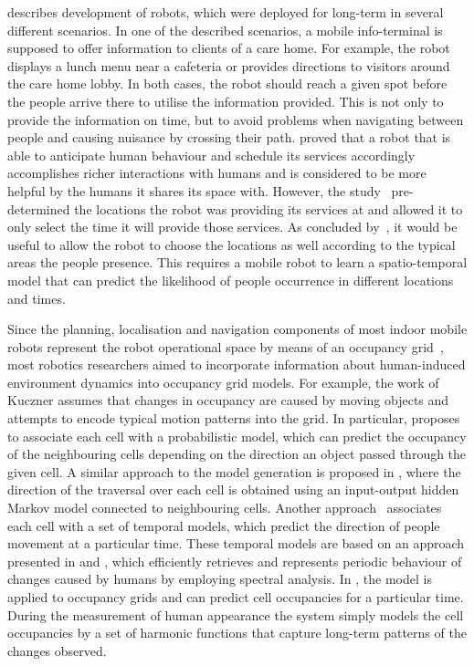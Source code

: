 \cite{hawes2017strands} describes development of robots, which were deployed for long-term in several different scenarios.
In one of the described scenarios, a mobile info-terminal is supposed to offer information to clients of a care home.
For example, the robot displays a lunch menu near a cafeteria or provides directions to visitors around the care home lobby.
In both cases, the robot should reach a given spot before the people arrive there to utilise the information provided.
This is not only to provide the information on time, but to avoid problems when navigating between people and causing nuisance by crossing their path.  
\cite{hawes2017strands,hanheide2017and} proved that a robot that is able to anticipate human behaviour and schedule its services accordingly accomplishes richer interactions with humans and is considered to be more helpful by the humans it shares its space with.  
However, the study~\cite{hanheide2017and} pre-determined the locations the robot was providing its services at and allowed it to only select the time it will provide those services.
As concluded by~\cite{hanheide2017and}, it would be useful to allow the robot to choose the locations as well according to the typical areas the people presence.
This requires a mobile robot to learn a spatio-temporal model that can predict the likelihood of people occurrence in different locations and times. 

Since the planning, localisation and navigation components of most indoor mobile robots represent the robot operational space by means of an occupancy grid~\cite{elfes1989using}, most robotics researchers aimed to incorporate information about human-induced environment dynamics into occupancy grid models.
For example, the work of Kuczner \cite{kucner2013conditional} assumes that changes in occupancy are caused by moving objects and attempts to encode typical motion patterns into the grid.
In particular, \cite{kucner2013conditional} proposes to associate each cell with a probabilistic model, which can predict the occupancy of the neighbouring cells depending on the direction an object passed through the given cell.  
A similar approach to the model generation is proposed in \cite{wang2014modeling}, where the direction of the traversal over each cell is obtained using an input-output hidden Markov model connected to neighbouring cells.
Another approach~\cite{molina2018modelling} associates each cell with a set of temporal models, which predict the direction of people movement at a particular time.
These temporal models are based on an approach presented in \cite{krajnik2014spectral} and \cite{krajnik2017fremen}, which efficiently retrieves and represents periodic behaviour of changes caused by humans by employing spectral analysis.
In \cite{krajnik2017fremen}, the model is applied to occupancy grids and can predict cell occupancies for a particular time. 
During the measurement of human appearance the system simply models the cell occupancies by a set of harmonic functions that capture long-term patterns of the changes observed.


